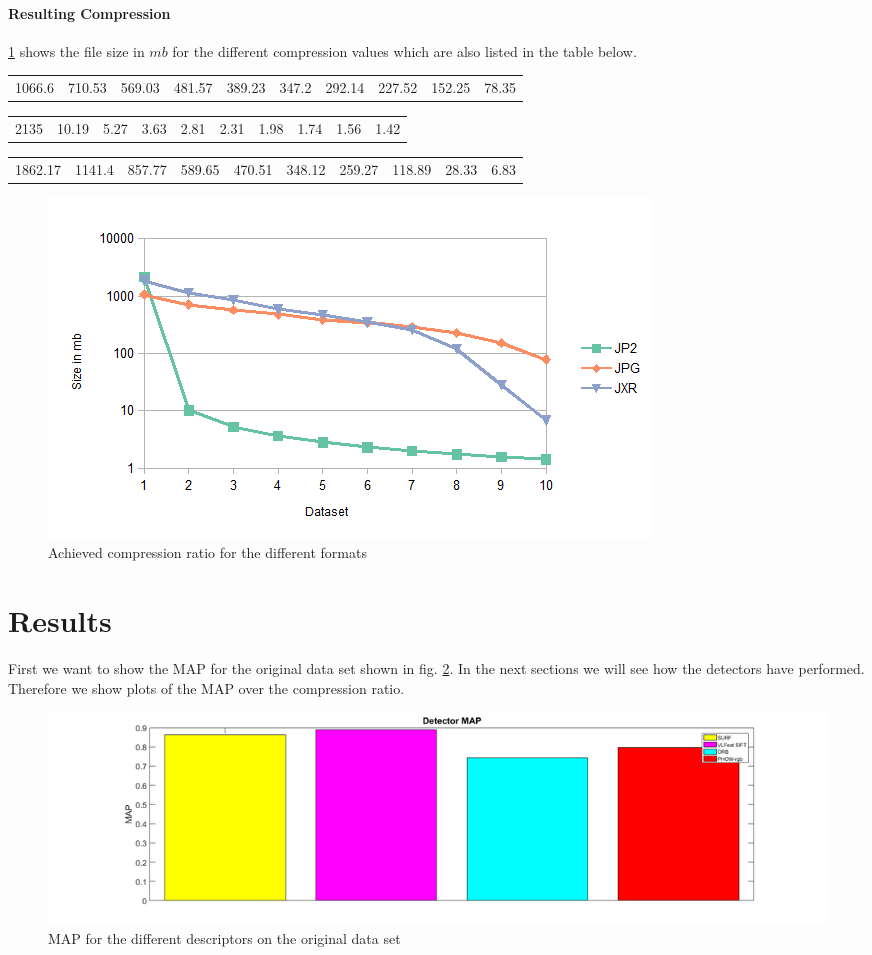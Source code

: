 \documentclass[10pt,a4paper]{article}
\begin{document}
\paragraph{Resulting Compression}
\ref{fig:compression} shows the file size in $mb$ for the different compression values which are also listed in the table below. 
\begin{center}
\begin{tabular}{cccccccccc}
1066.6 & 710.53 & 569.03 & 481.57 & 389.23 & 347.2 & 292.14 & 227.52 & 152.25 & 78.35
\end{tabular} 
\begin{tabular}{cccccccccc}
2135 & 10.19 & 5.27 & 3.63 & 2.81 & 2.31 & 1.98 & 1.74 & 1.56 & 1.42
\end{tabular} 
\begin{tabular}{cccccccccc}
1862.17 & 1141.4 & 857.77 & 589.65 & 470.51 & 348.12 & 259.27 & 118.89 & 28.33 & 6.83
\end{tabular} 
\end{center}
\begin{figure}[!htp]
\includegraphics[width=\textwidth]{img/compression.png}
	\caption{Achieved compression ratio for the different formats}
  \label{fig:compression}
\end{figure}

\section{Results}

First we want to show the MAP for the original data set shown in fig. \ref{fig:map}.
In the next sections we will see how the detectors have performed. Therefore we show plots of the MAP over the compression ratio.

\begin{figure}[!htp]
	\includegraphics[width=1.2\textwidth]{img/refmap.png}
	\caption{MAP for the different descriptors on the original data set}
	\label{fig:map}
\end{figure}
\end{document}
